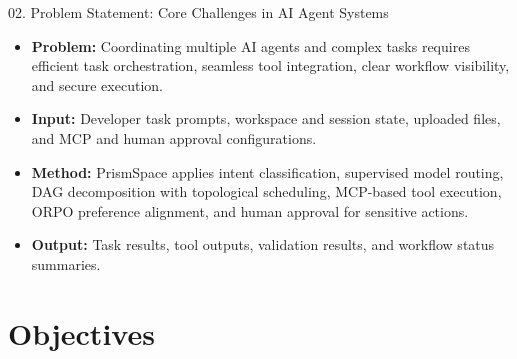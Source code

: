 \documentclass[aspectratio=169,10pt]{beamer}
\begin{document}
\begin{frame}[t]{02. Problem Statement: Core Challenges in AI Agent Systems}
\vfill
\begin{center}
\begin{minipage}{0.88\linewidth}
\large
\begin{itemize}
  \setlength{\itemsep}{12pt}
  \setlength{\leftmargin}{1.5em}
  \item \textbf{Problem:} Coordinating multiple AI agents and complex tasks requires efficient task orchestration, seamless tool integration, clear workflow visibility, and secure execution.
  \item \textbf{Input:} Developer task prompts, workspace and session state, uploaded files, and MCP and human approval configurations.
  \item \textbf{Method:} PrismSpace applies intent classification, supervised model routing, DAG decomposition with topological scheduling, MCP-based tool execution, ORPO preference alignment, and human approval for sensitive actions.
  \item \textbf{Output:} Task results, tool outputs, validation results, and workflow status summaries.
\end{itemize}
\end{minipage}
\end{center}
\vfill
\end{frame}

\section{Objectives}
\end{document}
